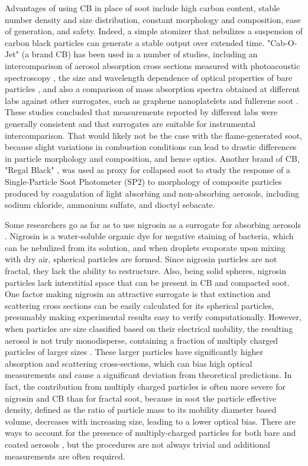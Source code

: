 Advantages of using CB in place of soot include high carbon content, stable number density and size distribution, constant morphology and composition, ease of generation, and safety. Indeed, a simple atomizer that nebulizes a suspension of carbon black particles can generate a stable output over extended time. "Cab-O-Jet" (a brand CB) has been used in a number of studies, including an intercomparison of aerosol absorption cross sections measured with photoacoustic spectroscopy \citep{RN3}, the size and wavelength dependence of optical properties of bare particles \citep{RN4}, and also a comparison of mass absorption spectra obtained at different labs against other surrogates, such as graphene nanoplatelets and fullerene soot \citep{RN63}. These studies concluded that measurements reported by different labs were generally consistent and that surrogates are suitable for instrumental intercomparison. That would likely not be the case with the flame-generated soot, because slight variations in combustion conditions can lead to drastic differences in particle morphology and composition, and hence optics. Another brand of CB, "Regal Black" \citep{RN65}, was used as proxy for collapsed soot to study the response of a Single-Particle Soot Photometer (SP2) to morphology of composite particles produced by coagulation of light absorbing and non-absorbing aerosols, including sodium chloride, ammonium sulfate, and dioctyl sebacate. 

Some researchers go as far as to use nigrosin as a surrogate for absorbing aerosols \citep{RN8,RN54,RN55,RN56,RN57,drinovec2022dual}. Nigrosin is a water-soluble organic dye for negative staining of bacteria, which can be nebulized from its solution, and when droplets evaporate upon mixing with dry air, spherical particles are formed. Since nigrosin particles are not fractal, they lack the ability to restructure. Also, being solid spheres, nigrosin particles lack interstitial space that can be present in CB and compacted soot. One factor making nigrosin an attractive surrogate is that extinction and scattering cross sections can be easily calculated for its spherical particles, presumably making experimental results easy to verify computationally. However, when particles are size classified based on their electrical mobility, the resulting aerosol is not truly monodisperse, containing a fraction of multiply charged particles of larger sizes \citep{mcmurry2002relationship,pagels2009processing}. These larger particles have significantly higher absorption and scattering cross-sections, which can bias high optical measurements \citep{RN50} and cause a significant deviation from theoretical predictions. In fact, the contribution from multiply charged particles is often more severe for nigrosin and CB than for fractal soot, because in soot the particle effective density, defined as the ratio of particle mass to its mobility diameter based volume, decreases with increasing size, leading to a lower optical bias. There are ways to account for the presence of multiply-charged particles for both bare and coated aerosols \citep{RN67, RN77}, but the procedures are not always trivial and additional measurements are often required. 

